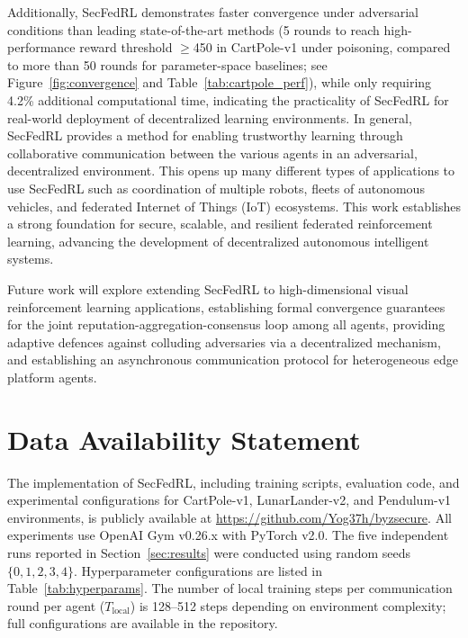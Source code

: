 \documentclass[12pt,a4paper]{article}
\begin{document}
Additionally, SecFedRL demonstrates faster convergence under adversarial conditions than leading
state-of-the-art methods (5 rounds to reach high-performance reward threshold $\geq$450
in CartPole-v1 under poisoning, compared to more than 50 rounds for parameter-space
baselines; see Figure~\ref{fig:convergence} and Table~\ref{tab:cartpole_perf}), while
only requiring 4.2\% additional computational time, indicating the practicality of SecFedRL for
real-world deployment of decentralized learning environments. In general, SecFedRL
provides a method for enabling trustworthy learning through collaborative communication
between the various agents in an adversarial, decentralized environment. This opens up
many different types of applications to use SecFedRL such as coordination of multiple
robots, fleets of autonomous vehicles, and federated Internet of Things (IoT)
ecosystems. This work establishes a strong foundation for secure, scalable, and
resilient federated reinforcement learning, advancing the development of decentralized
autonomous intelligent systems.

Future work will explore extending SecFedRL to high-dimensional visual
reinforcement learning applications, establishing formal convergence guarantees
for the joint reputation-aggregation-consensus loop among all agents, providing
adaptive defences against colluding adversaries via a decentralized mechanism,
and establishing an asynchronous communication protocol for heterogeneous edge
platform agents.

\section*{Data Availability Statement}

The implementation of SecFedRL, including training scripts, evaluation code, and
experimental configurations for CartPole-v1, LunarLander-v2, and Pendulum-v1
environments, is publicly available at \url{https://github.com/Yog37h/byzsecure}.
All experiments use OpenAI Gym v0.26.x with PyTorch v2.0. The five independent runs
reported in Section~\ref{sec:results} were conducted using random seeds $\{0, 1, 2, 3, 4\}$.
Hyperparameter configurations are listed in Table~\ref{tab:hyperparams}. The number
of local training steps per communication round per agent ($T_{\text{local}}$) is
128--512 steps depending on environment complexity; full configurations are available
in the repository.
\end{document}
